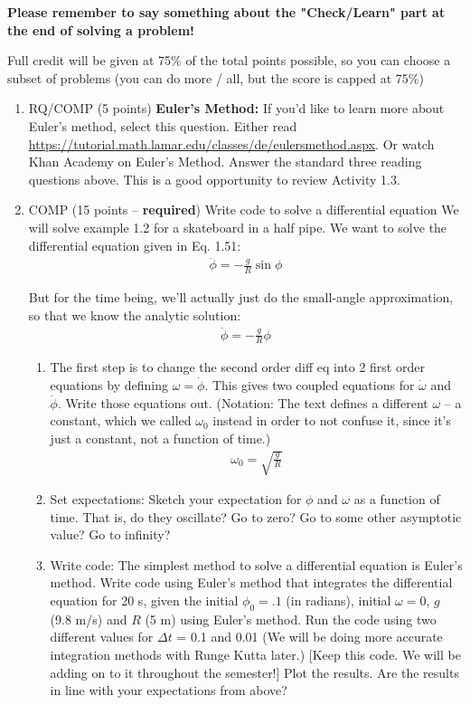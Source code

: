 \documentclass[12pt]{article}
\begin{document}
\textbf{Please remember to say something about the "Check/Learn" part at the end of solving a problem!}

Full credit will be given at 75\% of the total points possible, so you can choose a subset of problems (you can do more / all, but the score is capped at 75\%)

\begin{enumerate}
  \item	RQ/COMP (5 points) \textbf{Euler's Method:} If you'd like to learn more about Euler's method, select this question. Either read \url{https://tutorial.math.lamar.edu/classes/de/eulersmethod.aspx}.  Or watch Khan Academy on Euler's Method.  Answer the standard three reading questions above. This is a good opportunity to review Activity 1.3.

	\item COMP (15 points -- \textbf{required}) Write code to solve a differential equation We will solve example 1.2 for a skateboard in a half pipe.  We want to solve the differential equation given in Eq. 1.51:
  \begin{align}
    \ddot \phi = -\frac{g}{R} \sin \phi
  \end{align}

  But for the time being, we'll actually just do the small-angle approximation, so that we know the analytic solution:
  \begin{align}
    \ddot \phi = -\frac{g}{R} \phi
  \end{align}

  \begin{enumerate}
  \item	The first step is to change the second order diff eq into 2 first order equations by defining $\omega = \dot \phi$.  This gives two coupled equations for $\dot \omega$ and $\dot \phi$.  Write those equations out.  (Notation:  The text defines a different $\omega$ -- a constant, which we called $\omega_0$ instead in order to not confuse it, since it's just a constant, not a function of time.)
  \begin{align}
    \omega_0 = \sqrt{\frac{g}{R}}
  \end{align}

  \item Set expectations: Sketch your expectation for $\phi$ and $\omega$ as a function of time.  That is, do they oscillate?  Go to zero? Go to some other asymptotic value? Go to infinity?

  \item	Write code: The simplest method to solve a differential equation is Euler's method.  Write code using Euler's method that integrates the differential equation for 20 s, given the initial $\phi_0 = .1$ (in radians), initial $\omega = 0$, $g$ (9.8 m/s) and $R$ (5 m) using Euler's method.  Run the code using two different values for $\Delta t$ = 0.1 and 0.01  (We will be doing more accurate integration methods with Runge Kutta later.)  [Keep this code.  We will be adding on to it throughout the semester!]
	Plot the results.  Are the results in line with your expectations from above?


\end{enumerate}
\end{enumerate}
\end{document}
